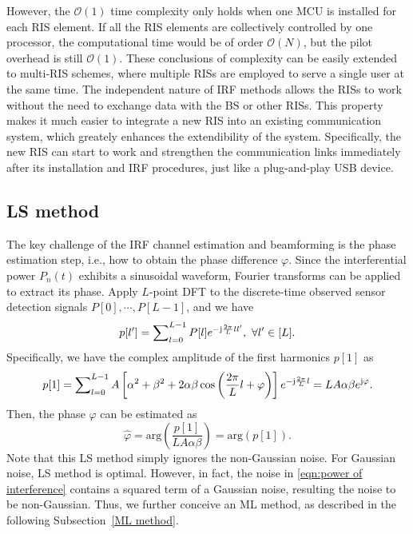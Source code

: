 \documentclass[12pt,draftclsnofoot,journal,onecolumn]{IEEEtran}
\theoremstyle{nonumberplain}
\def \arg {\text{arg}}
\begin{document}
    However, the $\mathcal{O}(1)$ time complexity only holds when one MCU is installed for each RIS element. If all the RIS elements are collectively controlled by one processor, the computational time would be of order $\mathcal{O}(N)$, but the pilot overhead is still $\mathcal{O}(1)$. These conclusions of complexity can be easily extended to multi-RIS schemes, where multiple RISs are employed to serve a single user at the same time. The independent nature of IRF methods allows the RISs to work without the need to exchange data with the BS or other RISs. This property makes it much easier to integrate a new RIS into an existing communication system, which greately enhances the extendibility of the system. Specifically, the new RIS can start to work and strengthen the communication links immediately after its installation and IRF procedures, just like a plug-and-play USB device. 

\subsection{LS method}  \label{LS method}
    The key challenge of the IRF channel estimation and beamforming is the phase estimation step, i.e., how to obtain the phase difference $\varphi$. Since the interferential power $P_n(t)$ exhibits a sinusoidal waveform, Fourier transforms can be applied to extract its phase. Apply $L$-point \ac{DFT} to the discrete-time  observed sensor detection signals $P[0],\cdots ,P[L-1]$, and we have
    \begin{equation}
        \label{DFT}
        p[l']=\sum\nolimits_{l=0}^{L-1}P[l]e^{-{\rm j}\frac{2\pi}{L}ll'},~\forall l'\in [L].
    \end{equation}
    Specifically, we have the complex amplitude of the first harmonics $p[1]$ as 
    \begin{equation}
        \label{DFT l=1}
        p[1]=\sum\nolimits_{l=0}^{L-1}A\left[\alpha^{2}+\beta^{2}+2\alpha\beta\cos\left(\frac{2\pi}{L}l+\varphi\right)\right]e^{-{\rm j}\frac{2\pi}{L}l}=LA\alpha\beta  e^{{\rm j}\varphi}.
    \end{equation}
    Then, the phase $\varphi$ can be estimated as
    \begin{equation}
        \label{LS estimate result}
        \hat{\varphi}=\arg\left(\frac{p[1]}{LA\alpha\beta}\right) = \arg\left(p[1]\right).
    \end{equation}
    Note that this LS method simply ignores the non-Gaussian noise. For Gaussian noise, LS method is optimal. However, in fact, the noise in \eqref{eqn:power of interference} contains a squared term of a Gaussian noise, resulting the noise to be non-Gaussian. Thus, we further conceive an ML method, as described in the following Subsection~\ref{ML method}. 
\end{document}
